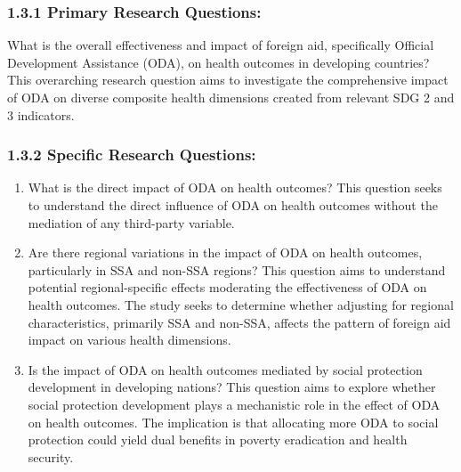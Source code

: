 \subsubsection*{1.3.1	Primary Research Questions:}

What is the overall effectiveness and impact of foreign aid, specifically Official Development Assistance (ODA), on health outcomes in developing countries? This overarching research question aims to investigate the comprehensive impact of ODA on diverse composite health dimensions created from relevant SDG 2 and 3 indicators. 
\subsubsection*{1.3.2	Specific Research Questions:}
\begin{enumerate}
    \item What is the direct impact of ODA on health outcomes? This question seeks to understand the direct influence of ODA on health outcomes without the mediation of any third-party variable.
    \item Are there regional variations in the impact of ODA on health outcomes, particularly in SSA and non-SSA regions? This question aims to understand potential regional-specific effects moderating the effectiveness of ODA on health outcomes. The study seeks to determine whether adjusting for regional characteristics, primarily SSA and non-SSA, affects the pattern of foreign aid impact on various health dimensions. 
    \item Is the impact of ODA on health outcomes mediated by social protection development in developing nations? This question aims to explore whether social protection development plays a mechanistic role in the effect of ODA on health outcomes. The implication is that allocating more ODA to social protection could yield dual benefits in poverty eradication and health security.
\end{enumerate}

